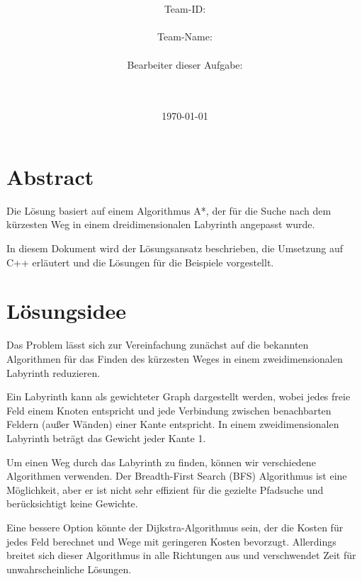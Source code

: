 \documentclass[a4paper,10pt,ngerman]{scrartcl}
\title{\textbf{\Huge\Aufgabe}}
\author{\LARGE Team-ID: \LARGE \TeamId \\\\
	    \LARGE Team-Name: \LARGE \TeamName \\\\
	    \LARGE Bearbeiter dieser Aufgabe: \\ 
	    \LARGE \Namen\\\\}
\date{\LARGE\today}
\begin{document}
\maketitle
\tableofcontents

\vspace{0.5cm}

\section{Abstract}


Die Lösung basiert auf einem Algorithmus A*, der für die Suche nach dem kürzesten Weg in einem dreidimensionalen Labyrinth angepasst wurde.

In diesem Dokument wird der Lösungsansatz beschrieben, die Umsetzung auf C++ erläutert und die Lösungen für die Beispiele vorgestellt.

\section{Lösungsidee}
% 

Das Problem lässt sich zur Vereinfachung zunächst auf die bekannten Algorithmen für das Finden des kürzesten Weges in einem zweidimensionalen Labyrinth reduzieren.

Ein Labyrinth kann als gewichteter Graph dargestellt werden, wobei jedes freie Feld einem Knoten entspricht und jede Verbindung zwischen benachbarten Feldern (außer Wänden) einer Kante entspricht. In einem zweidimensionalen Labyrinth beträgt das Gewicht jeder Kante 1.

Um einen Weg durch das Labyrinth zu finden, können wir verschiedene Algorithmen verwenden. Der Breadth-First Search (BFS) Algorithmus ist eine Möglichkeit, aber er ist nicht sehr effizient für die gezielte Pfadsuche und berücksichtigt keine Gewichte.

Eine bessere Option könnte der Dijkstra-Algorithmus sein, der die Kosten für jedes Feld berechnet und Wege mit geringeren Kosten bevorzugt. Allerdings breitet sich dieser Algorithmus in alle Richtungen aus und verschwendet Zeit für unwahrscheinliche Lösungen.
\end{document}
